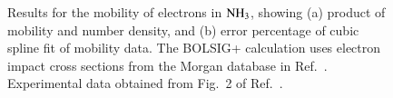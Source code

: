 \documentclass{warpdoc}
\let\citen\cite
\begin{document}
%
\begin{figure}
\centering
{}
\caption{Results for the mobility of electrons in ${\rm NH_3}$, showing (a) product of mobility and number density, and (b) error percentage of cubic spline fit of  mobility data. The BOLSIG+ calculation uses electron impact cross sections from the Morgan database in Ref.\ \citen{jcp:2012:morgan}. Experimental data obtained from Fig.\ 2 of Ref.\ \citen{jopd:2005:lisovskiy}.}
\label{fig:mobility_NH3}
\end{figure}
%
\end{document}
